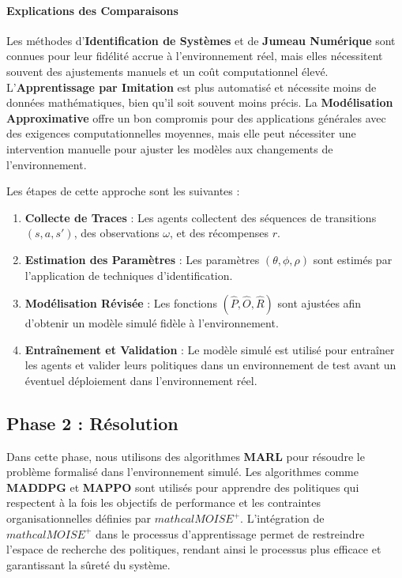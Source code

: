 \documentclass[sigconf,anonymous]{aamas}
\begin{document}
\paragraph{Explications des Comparaisons}

Les méthodes d'\textbf{Identification de Systèmes} et de \textbf{Jumeau Numérique} sont connues pour leur fidélité accrue à l'environnement réel, mais elles nécessitent souvent des ajustements manuels et un coût computationnel élevé. L'\textbf{Apprentissage par Imitation} est plus automatisé et nécessite moins de données mathématiques, bien qu'il soit souvent moins précis. La \textbf{Modélisation Approximative} offre un bon compromis pour des applications générales avec des exigences computationnelles moyennes, mais elle peut nécessiter une intervention manuelle pour ajuster les modèles aux changements de l'environnement.

Les étapes de cette approche sont les suivantes :
\begin{enumerate}
    \item \textbf{Collecte de Traces} : Les agents collectent des séquences de transitions \((s, a, s')\), des observations \(\omega\), et des récompenses \(r\).
    \item \textbf{Estimation des Paramètres} : Les paramètres \((\theta, \phi, \rho)\) sont estimés par l'application de techniques d'identification.
    \item \textbf{Modélisation Révisée} : Les fonctions \((\hat{P}, \hat{O}, \hat{R})\) sont ajustées afin d'obtenir un modèle simulé fidèle à l'environnement.
    \item \textbf{Entraînement et Validation} : Le modèle simulé est utilisé pour entraîner les agents et valider leurs politiques dans un environnement de test avant un éventuel déploiement dans l'environnement réel.
\end{enumerate}



\subsection{Phase 2 : Résolution}
Dans cette phase, nous utilisons des algorithmes \textbf{MARL} pour résoudre le problème formalisé dans l'environnement simulé. Les algorithmes comme \textbf{MADDPG} et \textbf{MAPPO} sont utilisés pour apprendre des politiques qui respectent à la fois les objectifs de performance et les contraintes organisationnelles définies par \textbf{$mathcal{M}OISE^+$}. L'intégration de \textbf{$mathcal{M}OISE^+$} dans le processus d'apprentissage permet de restreindre l'espace de recherche des politiques, rendant ainsi le processus plus efficace et garantissant la sûreté du système.
\end{document}
